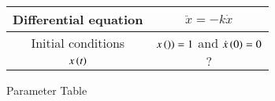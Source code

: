 \centering
\begin{tabular}{ | c | c|  } 
  \hline
   Differential equation & $\ddot{x} = -k\dot{x}$ \\ 
  \hline
  Initial conditions & $x\left(\right))=1$ and $\dot{x}\left(0\right)=0$ \\
  \hline
  $x\left(t\right)$ & $?$ \\ 
  \hline
\end{tabular}
\caption{Parameter Table}
\label{tab:gate2023.in.20}